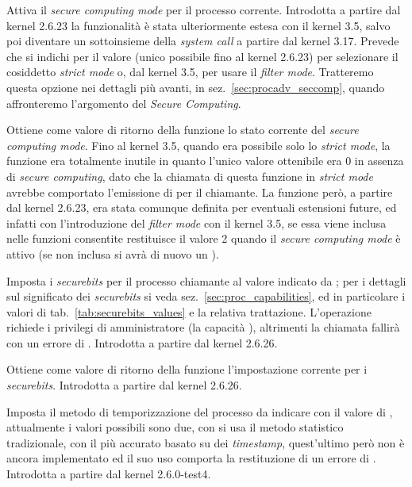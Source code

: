 \begin{basedescript}{\desclabelwidth{1.5cm}\desclabelstyle{\nextlinelabel}}
\item[\constd{PR\_SET\_SECCOMP}] Attiva il \textit{secure computing mode} per
  il processo corrente. Introdotta a partire dal kernel 2.6.23 la funzionalità
  è stata ulteriormente estesa con il kernel 3.5, salvo poi diventare un
  sottoinsieme della \textit{system call}  a partire dal kernel
  3.17. Prevede che si indichi per  il valore
   (unico possibile fino al kernel 2.6.23) per
  selezionare il cosiddetto \textit{strict mode} o, dal kernel 3.5,
   per usare il \textit{filter mode}. Tratteremo
  questa opzione nei dettagli più avanti, in sez.~\ref{sec:procadv_seccomp},
  quando affronteremo l'argomento del \textit{Secure Computing}.

\item[\constd{PR\_GET\_SECCOMP}] Ottiene come valore di ritorno della funzione
  lo stato corrente del \textit{secure computing mode}. Fino al kernel 3.5,
  quando era possibile solo lo \textit{strict mode}, la funzione era
  totalmente inutile in quanto l'unico valore ottenibile era 0 in assenza di
  \textit{secure computing}, dato che la chiamata di questa funzione in
  \textit{strict mode} avrebbe comportato l'emissione di  per
  il chiamante. La funzione però, a partire dal kernel 2.6.23, era stata
  comunque definita per eventuali estensioni future, ed infatti con
  l'introduzione del \textit{filter mode} con il kernel 3.5, se essa viene
  inclusa nelle funzioni consentite restituisce il valore 2 quando il
  \textit{secure computing mode} è attivo (se non inclusa si avrà di nuovo un
  ).

\item[\constd{PR\_SET\_SECUREBITS}] Imposta i \textit{securebits} per il
  processo chiamante al valore indicato da ; per i dettagli sul
  significato dei \textit{securebits} si veda
  sez.~\ref{sec:proc_capabilities}, ed in particolare i valori di
  tab.~\ref{tab:securebits_values} e la relativa trattazione. L'operazione
  richiede i privilegi di amministratore (la capacità ),
  altrimenti la chiamata fallirà con un errore di . Introdotta a
  partire dal kernel 2.6.26.

\item[\constd{PR\_GET\_SECUREBITS}] Ottiene come valore di ritorno della
  funzione l'impostazione corrente per i \textit{securebits}. Introdotta a
  partire dal kernel 2.6.26.

\item[\constd{PR\_SET\_TIMING}] Imposta il metodo di temporizzazione del
  processo da indicare con il valore di , attualmente i valori
  possibili sono due, con  si usa il metodo
  statistico tradizionale, con  il più accurato
  basato su dei \textit{timestamp}, quest'ultimo però non è ancora
  implementato ed il suo uso comporta la restituzione di un errore di
  . Introdotta a partire dal kernel 2.6.0-test4.


\end{basedescript}
